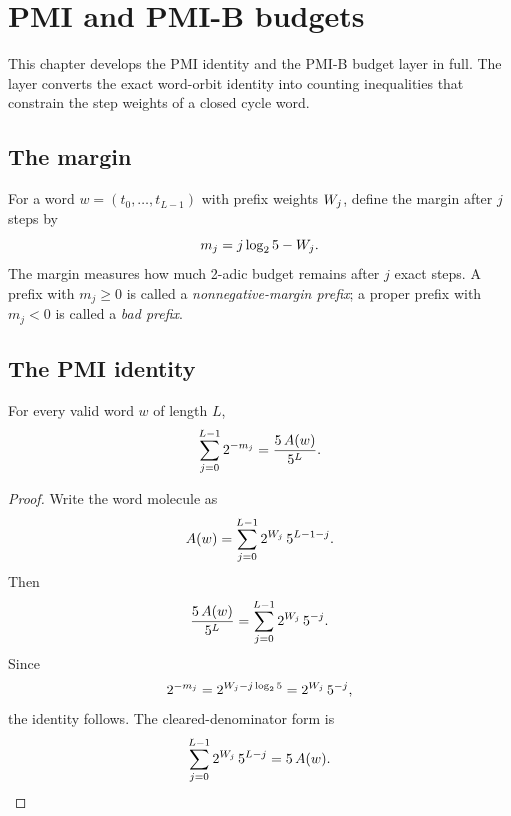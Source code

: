 \section{PMI and PMI-B budgets}

This chapter develops the PMI identity and the PMI-B budget layer in
full.  The layer converts the exact word-orbit identity into counting
inequalities that constrain the step weights of a closed cycle word.

\subsection{The margin}

For a word $w=(t_0,\dots,t_{L-1})$ with prefix weights
$W_j$, define the margin after $j$ steps by
\begin{equation*}
  m_j=j\log_2 5-W_j.
\end{equation*}
The margin measures how much 2-adic budget remains after $j$ exact
steps.  A prefix with $m_j\ge0$ is called a \emph{nonnegative-margin
prefix}; a proper prefix with $m_j<0$ is called a \emph{bad prefix}.

\subsection{The PMI identity}

\begin{theorem}
For every valid word $w$ of length $L$,
\begin{equation*}
  \sum_{j=0}^{L-1}2^{-m_j}
    =\frac{5\,A(w)}{5^L}.
\end{equation*}
\end{theorem}

\begin{proof}
Write the word molecule as
\begin{equation*}
  A(w)=\sum_{j=0}^{L-1}
    2^{W_j}\,5^{L-1-j}.
\end{equation*}
Then
\begin{equation*}
  \frac{5\,A(w)}{5^L}
    =\sum_{j=0}^{L-1}2^{W_j}\,5^{-j}.
\end{equation*}
Since
\begin{equation*}
  2^{-m_j}=2^{W_j-j\log_2 5}
    =2^{W_j}\,5^{-j},
\end{equation*}
the identity follows.  The cleared-denominator form is
\begin{equation*}
  \sum_{j=0}^{L-1}2^{W_j}\,5^{L-j}
    =5\,A(w).
\end{equation*}
\end{proof}


